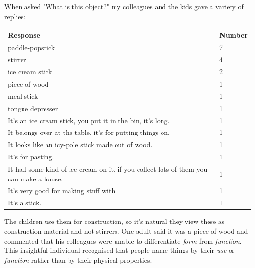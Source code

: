 \documentclass[a4paper,12pt,dvips]{article}
\begin{document}
When asked "What is this object?" my colleagues and the kids gave a variety of replies:
\begin{center}
	\begin{tabular}{|p{300pt}|p{50pt}|}
		\hline
		Response&Number\\
		\hline
		paddle-pop\footnotemark stick&7\\
		stirrer&4\\
		ice cream stick&2\\
		piece of wood&1\\
		meal stick&1\\
		tongue depresser&1\\
		\hline
		It's an ice cream stick, you put it in the bin, it's long.&1\\
		It belongs over at the table, it's for putting things on.&1\\
		It looks like an icy-pole stick made out of wood.&1\\
		It's for pasting.&1\\
		It had some kind of ice cream on it, if you collect lots of them you can make a house.&1\\
		It's very good for making stuff with.&1\\
		It's a stick.&1\\
		\hline
	\end{tabular}
\end{center}
The children use them for construction, so it's natural they view these as construction material and not stirrers. One adult said it was a piece of wood and commented that his colleagues were unable to differentiate \emph{form} from \emph{function}. This insightful individual recognised that people name things by their \emph{use} or \emph{function} rather than by their physical properties. 



%
\end{document}
